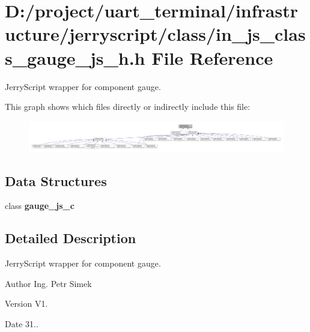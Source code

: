 \section{D\+:/project/uart\+\_\+terminal/infrastructure/jerryscript/class/in\+\_\+js\+\_\+class\+\_\+gauge\+\_\+js\+\_\+h.h File Reference}
\label{in__js__class__gauge__js__h_8h}


Jerry\+Script wrapper for component gauge.  


This graph shows which files directly or indirectly include this file\+:
\nopagebreak
\begin{figure}[H]
\begin{center}
\leavevmode
\includegraphics[width=350pt]{in__js__class__gauge__js__h_8h__dep__incl}
\end{center}
\end{figure}
\subsection*{Data Structures}
\begin{DoxyCompactItemize}
\item 
class \textbf{ gauge\+\_\+js\+\_\+c}
\end{DoxyCompactItemize}


\subsection{Detailed Description}
Jerry\+Script wrapper for component gauge. 

\begin{DoxyAuthor}{Author}
Ing. Petr Simek 
\end{DoxyAuthor}
\begin{DoxyVersion}{Version}
V1. 
\end{DoxyVersion}
\begin{DoxyDate}{Date}
31.. 
\end{DoxyDate}
